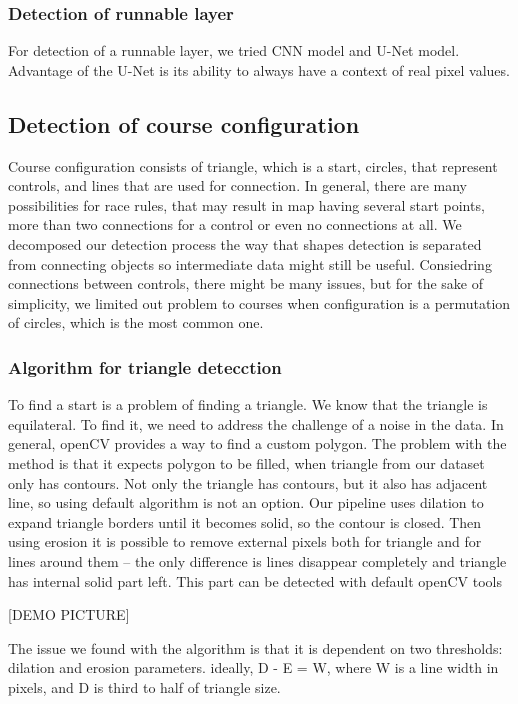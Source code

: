 \documentclass[a4paper,12pt]{extarticle}
\begin{document}
\subsubsection{Detection of runnable layer}

For detection of a runnable layer, we tried CNN model and U-Net model.
Advantage of the U-Net is its ability to always have a context of real pixel values.

\subsection{Detection of course configuration}

Course configuration consists of triangle, which is a start, circles, that represent controls, and lines that are used for connection.
In general, there are many possibilities for race rules, that may result in map having several start points, more than two connections for a control or even no connections at all.
We decomposed our detection process the way that shapes detection is separated from connecting objects so intermediate data might still be useful.
Consiedring connections between controls, there might be many issues, but for the sake of simplicity, we limited out problem to courses when  configuration is a permutation of circles, which is the most common one.

\subsubsection{Algorithm for triangle detecction}

To find a start is a problem of finding a triangle. We know that the triangle is equilateral. To find it, we need to address the challenge of a noise in the data. In general, openCV provides a way to find a custom polygon. The problem with the method is that it expects polygon to be filled, when triangle from our dataset only has contours. Not only the triangle has contours, but it also has adjacent line, so using default algorithm is not an option.
Our pipeline uses dilation to expand triangle borders until it becomes solid, so the contour is closed. Then using erosion it is possible to remove external pixels both for triangle and for lines around them -- the only difference is lines disappear completely and triangle has internal solid part left. This part can be detected with default openCV tools 

[DEMO PICTURE]

The issue we found with the algorithm is that it is dependent on two thresholds: dilation and erosion parameters. ideally, D - E = W, where W is a line width in pixels, and D is third to half of triangle size.
\end{document}
